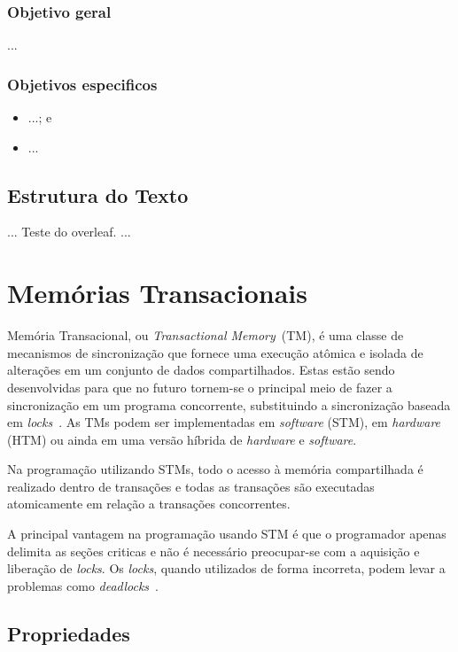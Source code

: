 \documentclass[diss,capa]{texufpel}
\begin{document}
\subsection{Objetivo geral}

...

\subsection{Objetivos especificos}

\begin{itemize}

  \item ...; e
  \item ...
\end{itemize}

\section{Estrutura do Texto}

...
Teste do overleaf.
...

\chapter{Memórias Transacionais}
\label{chapter::stm}

Memória Transacional, ou \emph{Transactional Memory}~(TM), é uma classe de mecanismos de sincronização que fornece uma execução atômica e isolada de alterações em um conjunto de dados compartilhados. Estas estão sendo desenvolvidas para que no futuro tornem-se o principal meio de fazer a sincronização em um programa concorrente, substituindo a sincronização baseada em \emph{locks}~\cite{energyawaretm}. As TMs podem ser implementadas em \emph{software} (STM), em \emph{hardware} (HTM) ou ainda em uma versão híbrida de \emph{hardware} e \emph{software}.

Na programação utilizando STMs, todo o acesso à memória compartilhada é realizado dentro de transações e todas as transações são executadas atomicamente em relação a transações concorrentes.

A principal vantagem na programação usando STM é que o programador apenas delimita as seções criticas e não é necessário preocupar-se com a aquisição e liberação de \emph{locks}. Os \emph{locks}, quando utilizados de forma incorreta, podem levar a problemas como \emph{deadlocks}~\cite{BAND10}.

\section{Propriedades}
\end{document}
